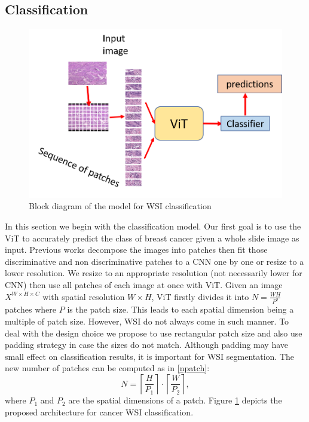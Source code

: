 \documentclass[review]{cvpr}
\begin{document}
\subsection{Classification}
\begin{figure}[ht]
\begin{center}
   \includegraphics[width=0.8\linewidth]{media/classify.png}
\end{center}
   \caption{Block diagram of the model for WSI classification}
\label{fig:cls}
\end{figure}
In this section we begin with the classification model. Our first goal is to use the ViT to accurately predict the class of breast cancer given a whole slide image as input. Previous works \cite{7780635} decompose the images into patches then fit those discriminative and non discriminative patches to a CNN one by one or resize to a lower resolution. We resize to an appropriate resolution (not necessarily lower for CNN) then use all patches of each image at once with ViT. Given an image $X^{W \times H \times C}$ with spatial resolution ${W \times H}$, ViT firstly divides it into $N=\frac{WH}{P^2}$ patches where $P$ is the patch size. This leads to each spatial dimension being a multiple of patch size. However, WSI do not always come in such manner. To deal with the design choice we propose to use rectangular patch size and also use padding strategy in case the sizes do not match. Although padding may have small effect on classification results, it is important for WSI segmentation. The new number of patches can be computed as in \ref{npatch}:
\begin{equation}
    N= \left\lceil\frac{H}{P_1}\right\rceil \cdot \left\lceil\frac{W}{P_2}\right\rceil,
    \label{npatch}
\end{equation}
where $P_1$ and $P_2$ are the spatial dimensions of a patch. Figure \ref{fig:cls} depicts the proposed architecture for cancer WSI classification.
\end{document}
